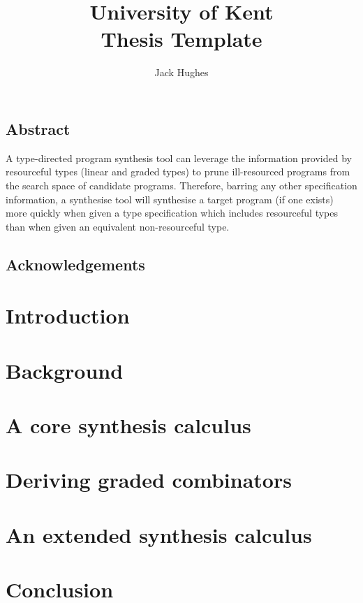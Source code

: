 \documentclass[12pt,draft]{UoKthesis}
\theoremstyle{plain}%
\theoremstyle{definition}
\begin{document}
\normalsize
\title{University of Kent\\Thesis Template}
\author{Jack Hughes}
\subject{computer science}

\begin{preface}
\section{Abstract}
A type-directed program synthesis tool can leverage the information provided by
resourceful types (linear and graded types) to prune ill-resourced programs from
the search space of candidate programs. Therefore, barring any other
specification information, a synthesise tool will synthesise a target program
(if one exists) more quickly when given a type specification which includes
resourceful types than when given an equivalent non-resourceful type.


\section{Acknowledgements}
\end{preface}


\chapter{Introduction}
\label{chapter:intro}


\chapter{Background}
\label{chapter:background}


\chapter{A core synthesis calculus}
\label{chapter:core}


\chapter{Deriving graded combinators}
\label{chapter:deriving}


\chapter{An extended synthesis calculus}
\label{chapter:extended}


\chapter{Conclusion}
\label{chapter:conclusion}




\appendix
\end{document}

